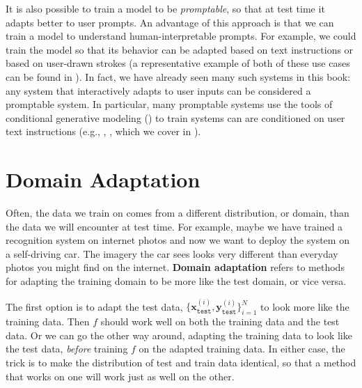It is also possible to train a model to be \textit{promptable}, so that at test time it adapts better to user prompts. An advantage of this approach is that we can train a model to understand human-interpretable prompts. For example, we could train the model so that its behavior can be adapted based on text instructions or based on user-drawn strokes (a representative example of both of these use cases can be found in \cite{kirillov2023segment}). In fact, we have already seen many such systems in this book: any system that interactively adapts to user inputs can be considered a promptable system. In particular, many promptable systems use the tools of conditional generative modeling (\chap{\ref{chapter:conditional_generative_models}}) to train systems can are conditioned on user text instructions (e.g., \cite{dalle1}, \cite{rombach2022high}, which we cover in \chap{\ref{chapter:VLMs}}).




\section{Domain Adaptation}

Often, the data we train on comes from a different distribution, or domain, than the data we will encounter at test time. For example, maybe we have trained a recognition system on internet photos and now we want to deploy the system on a self-driving car. The imagery the car sees looks very different than everyday photos you might find on the internet. \textbf{Domain adaptation} refers to methods for adapting the training domain to be more like the test domain, or vice versa.

The first option is to adapt the test data, $\{\mathbf{x}_{\texttt{test}}^{(i)},\mathbf{y}_{\texttt{test}}^{(i)}\}_{i=1}^N$ to look more like the training data. Then $f$ should work well on both the training data and the test data. Or we can go the other way around, adapting the training data to look like the test data, \textit{before} training $f$ on the adapted training data. In either case, the trick is to make the distribution of test and train data identical, so that a method that works on one will work just as well on the other.

